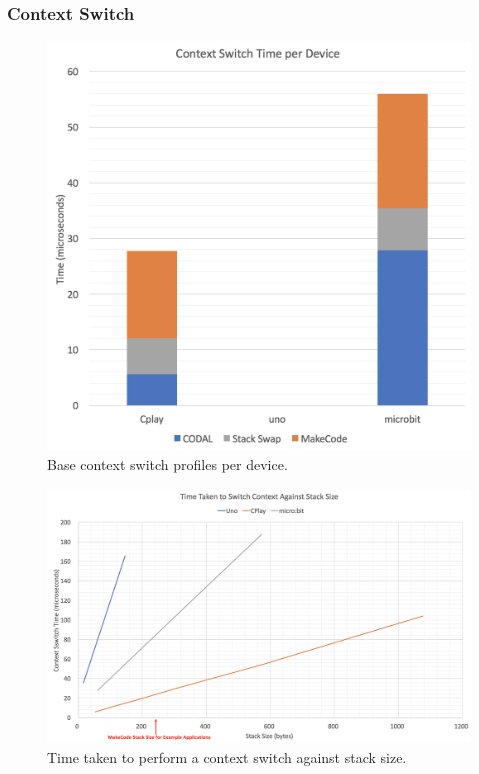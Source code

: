 \subsubsection{Context Switch}

\begin{figure}[ht]
    \includegraphics[width=.9\columnwidth]{images/context-switch.png}
\caption{\label{fig:context-switch}Base context switch profiles per device.}
\end{figure}

\begin{figure}[ht]
    \includegraphics[width=.9\columnwidth]{images/context-vs-stack.png}
\caption{\label{fig:context-vs-stack}Time taken to perform a context switch against stack size.}
\end{figure}

